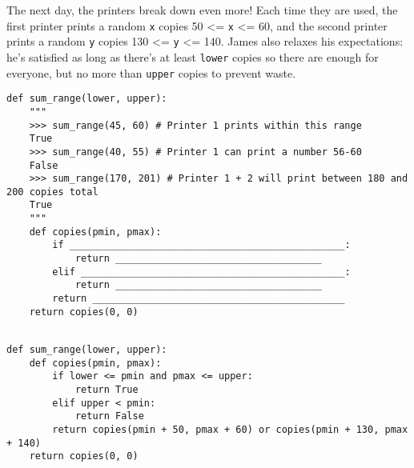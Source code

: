 \begin{blocksection}
\question The next day, the printers break down even more! Each time they are used, the first printer 
prints a random \lstinline$x$ copies 50 <= \lstinline$x$ <= 60, and the second printer prints a 
random \lstinline$y$ copies 130 <= \lstinline$y$ <= 140. James also relaxes his expectations: he's
satisfied as long as there's at least \lstinline$lower$ copies so there are enough for everyone, but no
more than \lstinline$upper$ copies to prevent waste. \\

\begin{lstlisting}
def sum_range(lower, upper):
    """
    >>> sum_range(45, 60) # Printer 1 prints within this range
    True
    >>> sum_range(40, 55) # Printer 1 can print a number 56-60
    False
    >>> sum_range(170, 201) # Printer 1 + 2 will print between 180 and 200 copies total
    True
    """
    def copies(pmin, pmax):
        if ________________________________________________:
            return ____________________________________
        elif ______________________________________________:
            return ____________________________________
        return ____________________________________________
    return copies(0, 0)
    
\end{lstlisting}

\begin{solution}[1.5in]
\begin{lstlisting}
def sum_range(lower, upper):
    def copies(pmin, pmax):
        if lower <= pmin and pmax <= upper:
            return True
        elif upper < pmin:
            return False
        return copies(pmin + 50, pmax + 60) or copies(pmin + 130, pmax + 140)
    return copies(0, 0)
\end{lstlisting}
\end{solution}
\end{blocksection}
